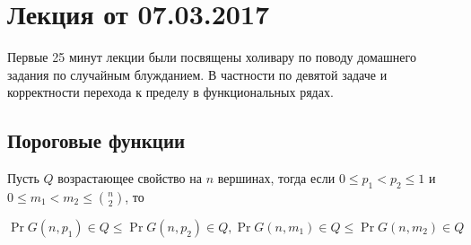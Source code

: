 \section{Лекция от 07.03.2017}

Первые 25 минут лекции были посвящены холивару по поводу домашнего задания по
случайным блужданием. В частности по девятой задаче и корректности
перехода к пределу в функциональных рядах.

\subsection{Пороговые функции}


\begin{lemma}
  Пусть $Q$ возрастающее свойство на $n$ вершинах, тогда если $0 \leq p_1
  < p_2 \leq 1$ и $0 \leq m_1 < m_2 \leq \binom{n}{2}$, то

  \[
    \Pr{G(n, p_1) \in Q} \leq \Pr{G(n, p_2) \in Q}, \Pr{G(n, m_1) \in Q} \leq
    \Pr{G(n, m_2) \in Q}
  \]
\end{lemma}

